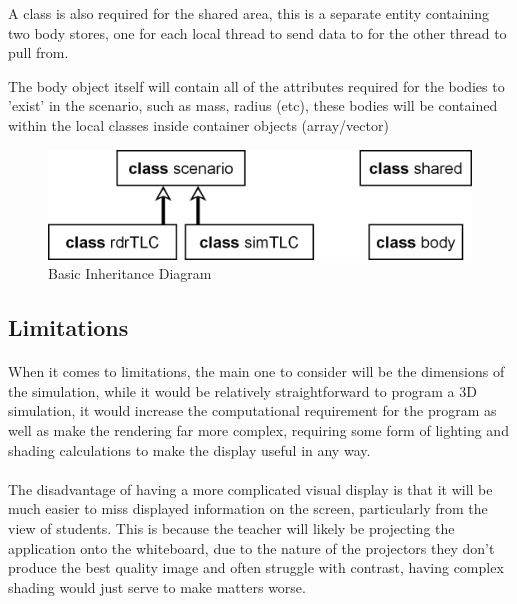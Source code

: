 A class is also required for the shared area, this is a separate entity containing two body stores, one for each local thread to send data to for the other thread to pull from.

The body object itself will contain all of the attributes required for the bodies to 'exist' in the scenario, such as mass, radius (etc), these bodies will be contained within the local classes inside container objects (array/vector)

\begin{figure}[H]
  \centering
  \includegraphics[width=\textwidth]{img/aid.png}
  \caption{Basic Inheritance Diagram}
\end{figure}

\pagebreak

\subsection{Limitations}
\paragraph{}
When it comes to limitations, the main one to consider will be the dimensions of the simulation, while it would be relatively straightforward to program a 3D simulation, it would increase the computational requirement for the program as well as make the rendering far more complex, requiring some form of lighting and shading calculations to make the display useful in any way.

\paragraph{}
The disadvantage of having a more complicated visual display is that it will be much easier to miss displayed information on the screen, particularly from the view of students. This is because the teacher will likely be projecting the application onto the whiteboard, due to the nature of the projectors they don't produce the best quality image and often struggle with contrast, having complex shading would just serve to make matters worse.

